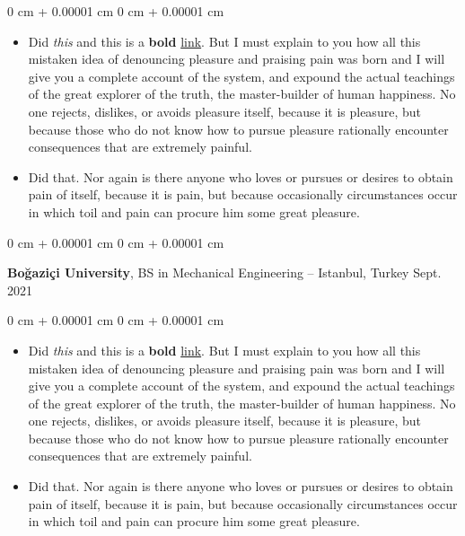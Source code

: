 \documentclass[10pt, letterpaper]{article}
\newenvironment{highlights}{
    \begin{itemize}[
        topsep=0.10 cm,
        parsep=0.10 cm,
        partopsep=0pt,
        itemsep=0pt,
        leftmargin=0 cm + 10pt
    ]
}{
    \end{itemize}
} %
\newenvironment{onecolentry}{
    \begin{adjustwidth}{
        0 cm + 0.00001 cm
    }{
        0 cm + 0.00001 cm
    }
}{
    \end{adjustwidth}
} %
\newenvironment{twocolentry}[2][]{
    \onecolentry
    \def\secondColumn{#2}
    \setcolumnwidth{\fill, 4.5 cm}
    \begin{paracol}{2}
}{
    \switchcolumn \raggedleft \secondColumn
    \end{paracol}
    \endonecolentry
} %
\begin{document}
        \vspace{0.10 cm}
        \begin{onecolentry}
            \begin{highlights}
                \item Did \textit{this} and this is a \textbf{bold} \href{https://example.com}{link}. But I must explain to you how all this mistaken idea of denouncing pleasure and praising pain was born and I will give you a complete account of the system, and expound the actual teachings of the great explorer of the truth, the master-builder of human happiness. No one rejects, dislikes, or avoids pleasure itself, because it is pleasure, but because those who do not know how to pursue pleasure rationally encounter consequences that are extremely painful.
                \item Did that. Nor again is there anyone who loves or pursues or desires to obtain pain of itself, because it is pain, but because occasionally circumstances occur in which toil and pain can procure him some great pleasure.
            \end{highlights}
        \end{onecolentry}


        \vspace{0.2 cm}

        \begin{twocolentry}{
            Sept. 2021
        }
            \textbf{Boğaziçi University}, BS in Mechanical Engineering -- Istanbul, Turkey\end{twocolentry}

        \vspace{0.10 cm}
        \begin{onecolentry}
            \begin{highlights}
                \item Did \textit{this} and this is a \textbf{bold} \href{https://example.com}{link}. But I must explain to you how all this mistaken idea of denouncing pleasure and praising pain was born and I will give you a complete account of the system, and expound the actual teachings of the great explorer of the truth, the master-builder of human happiness. No one rejects, dislikes, or avoids pleasure itself, because it is pleasure, but because those who do not know how to pursue pleasure rationally encounter consequences that are extremely painful.
                \item Did that. Nor again is there anyone who loves or pursues or desires to obtain pain of itself, because it is pain, but because occasionally circumstances occur in which toil and pain can procure him some great pleasure.
            \end{highlights}
        \end{onecolentry}
\end{document}
